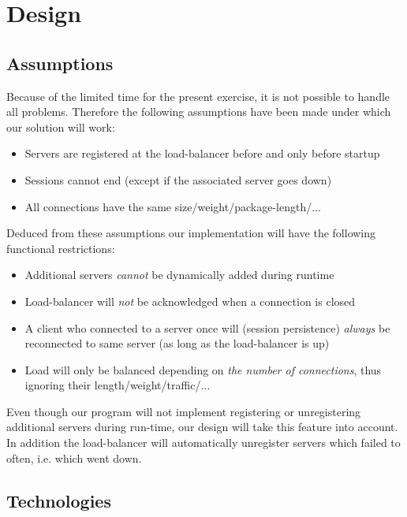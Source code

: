 \documentclass[11pt, a4paper]{article}
\begin{document}
\section{Design}

\subsection{Assumptions}

Because of the limited time for the present exercise, it is not
possible to handle all problems. Therefore the following assumptions
have been made under which our solution will work:

\vspace{-10pt}
\begin{itemize}
\item Servers are registered at the load-balancer before and only
  before startup
\item Sessions cannot end (except if the associated server goes down)
\item All connections have the same size/weight/package-length/...
\end{itemize}
\vspace{-10pt}

Deduced from these assumptions our implementation will have the
following functional restrictions:

\vspace{-10pt}
\begin{itemize}
\item Additional servers \textit{cannot} be dynamically added during
  runtime
\item Load-balancer will \textit{not} be acknowledged when a
  connection is closed
\item A client who connected to a server once will (session
  persistence) \textit{always} be reconnected to same server (as long
  as the load-balancer is up)
\item Load will only be balanced depending on \textit{the number of
    connections}, thus ignoring their length/weight/traffic/...
\end{itemize}
\vspace{-10pt}

Even though our program will not implement registering or unregistering additional servers during run-time, our design will take this feature into account. In addition the load-balancer will automatically unregister servers which failed to often, i.e. which went down.

\subsection{Technologies}
\end{document}

